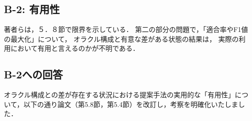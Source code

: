 \documentclass{jsarticle}
\begin{document}
\subsection*{B-2: 有用性}
\begin{screen}
著者らは，５．８節で限界を示している．
第二の部分の問題で，「適合率やF1値の最大化」について，
オラクル構成と有意な差がある状態の結果は，
実際の利用において有用と言えるのかが不明である．
\end{screen}

\subsection*{B-2への回答}
オラクル構成との差が存在する状況における提案手法の実用的な「有用性」について，以下の通り論文（第5.8節，第5.4節）を改訂し，考察を明確化いたしました．
\end{document}
